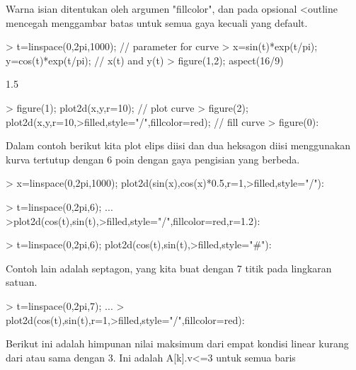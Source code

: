 \documentclass{report}
\begin{document}
\begin{eulernotebook}
\begin{eulercomment}
\begin{eulercomment}
\begin{eulercomment}
\begin{eulercomment}
\begin{eulercomment}
Warna isian ditentukan oleh argumen "fillcolor", dan pada opsional
\textless{}outline mencegah menggambar batas untuk semua gaya kecuali yang
default.
\end{eulercomment}
\begin{eulerprompt}
> t=linspace(0,2pi,1000); // parameter for curve
> x=sin(t)*exp(t/pi); y=cos(t)*exp(t/pi); // x(t) and y(t)
> figure(1,2); aspect(16/9)
\end{eulerprompt}
\begin{euleroutput}
  1.5
\end{euleroutput}
\begin{eulerprompt}
> figure(1); plot2d(x,y,r=10); // plot curve
> figure(2); plot2d(x,y,r=10,>filled,style="/",fillcolor=red); // fill curve
> figure(0):
\end{eulerprompt}
\begin{eulercomment}
Dalam contoh berikut kita plot elips diisi dan dua heksagon diisi
menggunakan kurva tertutup dengan 6 poin dengan gaya pengisian yang
berbeda.
\end{eulercomment}
\begin{eulerprompt}
> x=linspace(0,2pi,1000); plot2d(sin(x),cos(x)*0.5,r=1,>filled,style="/"):
\end{eulerprompt}
\begin{eulerprompt}
> t=linspace(0,2pi,6); ...
>plot2d(cos(t),sin(t),>filled,style="/",fillcolor=red,r=1.2):
\end{eulerprompt}
\begin{eulerprompt}
> t=linspace(0,2pi,6); plot2d(cos(t),sin(t),>filled,style="#"):
\end{eulerprompt}
\begin{eulercomment}
Contoh lain adalah septagon, yang kita buat dengan 7 titik pada
lingkaran satuan.
\end{eulercomment}
\begin{eulerprompt}
> t=linspace(0,2pi,7);  ...
> plot2d(cos(t),sin(t),r=1,>filled,style="/",fillcolor=red):
\end{eulerprompt}
\begin{eulercomment}
Berikut ini adalah himpunan nilai maksimum dari empat kondisi linear
kurang dari atau sama dengan 3. Ini adalah A[k].v\textless{}=3 untuk semua baris

\end{eulercomment}
\end{eulercomment}
\end{eulercomment}
\end{eulercomment}
\end{eulercomment}
\end{eulernotebook}
\end{document}
